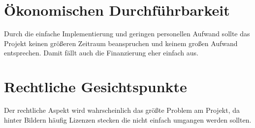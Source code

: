 \documentclass[parskip=full]{scrartcl}
\begin{document}
\section{Ökonomischen Durchführbarkeit}
\begin{flushleft}
	Durch die einfache Implementierung und geringen personellen Aufwand sollte das Projekt keinen größeren Zeitraum beanspruchen und keinem großen Aufwand entsprechen. Damit fällt auch die Finanzierung eher einfach aus.
\end{flushleft}

\section{Rechtliche Gesichtspunkte}
\begin{flushleft}
	Der rechtliche Aspekt wird wahrscheinlich das größte Problem am Projekt, da hinter Bildern häufig Lizenzen stecken die nicht einfach umgangen werden sollten. 
\end{flushleft}
\end{document}
